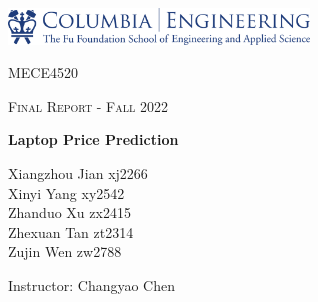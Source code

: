 \documentclass{scrartcl}
\begin{document}
\begin{titlepage}
	\centering
	\includegraphics[width=0.6\textwidth]{Graphics/CU E LOGO.png}\par
	\vspace{1cm}
	{\scshape\LARGE MECE4520 \par}      
 
	\vspace{1cm}
	{\scshape\Large Final Report - Fall 2022\par}
	\vfill
	
	{\huge\bfseries Laptop Price Prediction\par}
	\vfill
	
	{\Large Xiangzhou Jian xj2266\\Xinyi Yang xy2542\\Zhanduo Xu zx2415\\Zhexuan Tan zt2314\\Zujin Wen zw2788\\}\par
	\vspace{1.5cm}

	\vfill
	{\large Instructor: Changyao Chen}\par



	\vfill
\end{titlepage}


\newpage



\doublespacing
\tableofcontents
\singlespacing

\newpage

\doublespacing



\end{document}
